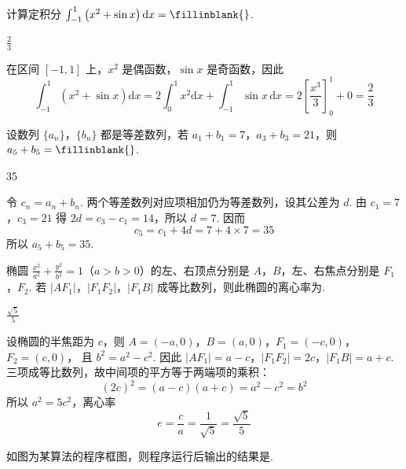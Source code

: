 \begin{problem}
计算定积分 \(\int_{-1}^{1}\left(x^{2} + \sin x\right)\mathrm{d}x =\fillinblank{}\).
\end{problem}

\begin{answer}
\(\frac{2}{3}\)
\end{answer}

\begin{solution}
在区间 \([-1,1]\) 上，\(x^2\) 是偶函数，\(\sin x\) 是奇函数，因此
\[
\int_{-1}^{1}\left(x^2+\sin x\right)\mathrm{d}x
=2\int_0^1x^2\mathrm{d}x+\int_{-1}^{1}\sin x\,\mathrm{d}x
=2\left[\frac{x^3}{3}\right]_0^1+0
=\frac23
\]
\end{solution}

\begin{problem}
设数列 \(\{a_{n}\}\)，\(\{b_{n}\}\) 都是等差数列，若 \(a_{1} + b_{1} = 7\)，\(a_{3} + b_{3} = 21\)，则 \(a_{5} + b_{5} =\fillinblank{}\).
\end{problem}

\begin{answer}
35
\end{answer}

\begin{solution}
令 \(c_n=a_n+b_n\). 两个等差数列对应项相加仍为等差数列，设其公差为 \(d\). 由
\(c_1=7\)，\(c_3=21\)
得 \(2d=c_3-c_1=14\)，所以 \(d=7\). 因而
\[
c_5=c_1+4d=7+4\times7=35
\]
所以 \(a_5+b_5=35\).
\end{solution}

\begin{problem}
椭圆 \(\frac{x^{2}}{a^{2}} + \frac{y^{2}}{b^{2}} = 1\)（\(a > b > 0\)）的左、右顶点分别是 \(A\)，\(B\)，左、右焦点分别是 \(F_1\)，\(F_2\). 若 \(|AF_1|\)，\(|F_1F_2|\)，\(|F_1B|\) 成等比数列，则此椭圆的离心率为\fillinblank{}.
\end{problem}

\begin{answer}
\(\frac{\sqrt{5}}{5}\)
\end{answer}

\begin{solution}
设椭圆的半焦距为 \(c\)，则
\(A=(-a,0)\)，\(B=(a,0)\)，\(F_1=(-c,0)\)，\(F_2=(c,0)\)，
且 \(b^2=a^2-c^2\). 因此
\(|AF_1|=a-c\)，\(|F_1F_2|=2c\)，\(|F_1B|=a+c\).
三项成等比数列，故中间项的平方等于两端项的乘积：
\[
(2c)^2=(a-c)(a+c)=a^2-c^2=b^2
\]
所以 \(a^2=5c^2\)，离心率
\[
e=\frac ca=\frac1{\sqrt5}=\frac{\sqrt5}{5}
\]
\end{solution}

\begin{problem}
如图为某算法的程序框图，则程序运行后输出的结果是\fillinblank{}.

\end{problem}

